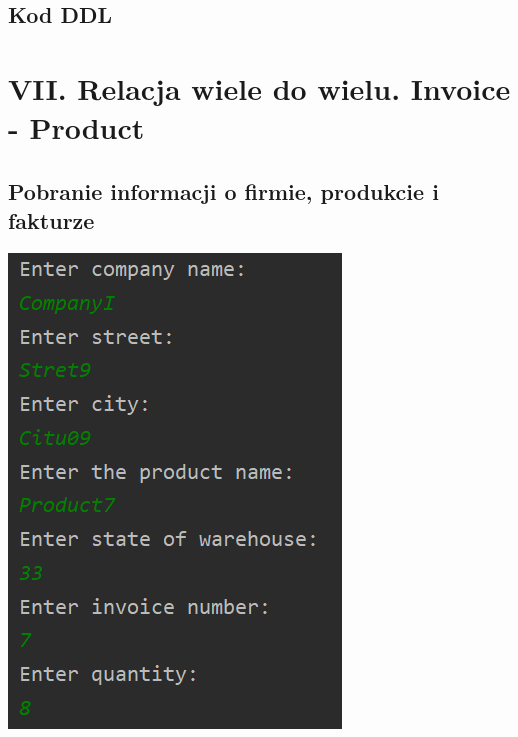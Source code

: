 \documentclass[a4paper, 11pt]{article}
\begin{document}
    \newpage

    \subsection{Kod DDL}
    

    \newpage



    \section{VII. Relacja wiele do wielu. Invoice - Product}

    \subsection{Pobranie informacji o firmie, produkcie i fakturze}
    \begin{center}
        \includegraphics[scale=1.3]{images/point7/addCompanyProductInvoice.png}
    \end{center}
\end{document}
